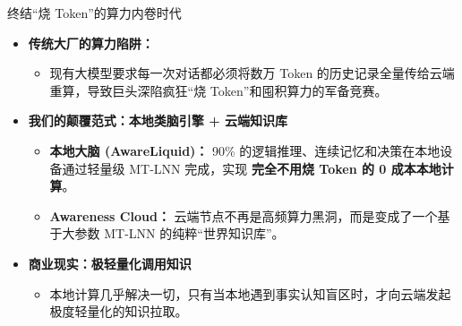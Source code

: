 ﻿\documentclass[aspectratio=169, 10pt]{beamer}
\begin{document}
\begin{frame}{终结“烧 Token”的算力内卷时代}
\small
\begin{itemize}\itemsep=0.3em
    \item \textbf{传统大厂的算力陷阱：} 
    \begin{itemize}
        \item 现有大模型要求每一次对话都必须将数万 Token 的历史记录全量传给云端重算，导致巨头深陷疯狂“烧 Token”和囤积算力的军备竞赛。
    \end{itemize}
    \vspace{0.4em}
    \item \textbf{我们的颠覆范式：本地类脑引擎 + 云端知识库}
    \begin{itemize}
        \item \textbf{本地大脑 (AwareLiquid)：} 90\% 的逻辑推理、连续记忆和决策在本地设备通过轻量级 MT-LNN 完成，实现 \textbf{完全不用烧 Token 的 0 成本本地计算}。
        \item \textbf{Awareness Cloud：} 云端节点不再是高频算力黑洞，而是变成了一个基于大参数 MT-LNN 的纯粹“世界知识库”。
    \end{itemize}
    \vspace{0.4em}
    \item \textbf{商业现实：极轻量化调用知识} 
    \begin{itemize}
        \item 本地计算几乎解决一切，只有当本地遇到事实认知盲区时，才向云端发起极度轻量化的知识拉取。
    \end{itemize}
\end{itemize}
\end{frame}
\end{document}

